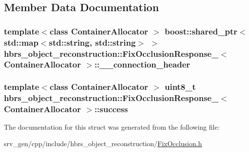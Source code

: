 \subsection{\-Member \-Data \-Documentation}
\hypertarget{structhbrs__object__reconstruction_1_1_fix_occlusion_response___ae0b23c01209db08f97f2b47131825bbc}{
\subsubsection[{\-\_\-\-\_\-connection\-\_\-header}]{\setlength{\rightskip}{0pt plus 5cm}template$<$class Container\-Allocator $>$ boost\-::shared\-\_\-ptr$<$std\-::map$<$std\-::string, std\-::string$>$ $>$ {\bf hbrs\-\_\-object\-\_\-reconstruction\-::\-Fix\-Occlusion\-Response\-\_\-}$<$ \-Container\-Allocator $>$\-::{\bf \-\_\-\-\_\-connection\-\_\-header}}}\label{structhbrs__object__reconstruction_1_1_fix_occlusion_response___ae0b23c01209db08f97f2b47131825bbc}
\hypertarget{structhbrs__object__reconstruction_1_1_fix_occlusion_response___a20fead6fb4b41dd3c3bd6c2d71103513}{
\subsubsection[{success}]{\setlength{\rightskip}{0pt plus 5cm}template$<$class Container\-Allocator $>$ uint8\-\_\-t {\bf hbrs\-\_\-object\-\_\-reconstruction\-::\-Fix\-Occlusion\-Response\-\_\-}$<$ \-Container\-Allocator $>$\-::{\bf success}}}\label{structhbrs__object__reconstruction_1_1_fix_occlusion_response___a20fead6fb4b41dd3c3bd6c2d71103513}


\-The documentation for this struct was generated from the following file\-:\begin{DoxyCompactItemize}
\item 
srv\-\_\-gen/cpp/include/hbrs\-\_\-object\-\_\-reconstruction/\hyperlink{_fix_occlusion_8h}{\-Fix\-Occlusion.\-h}\end{DoxyCompactItemize}
